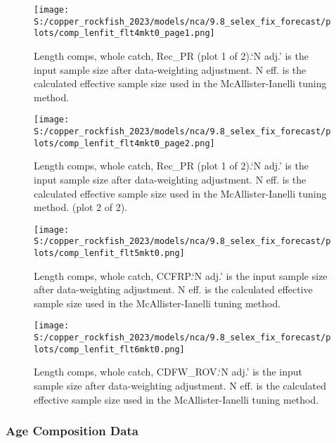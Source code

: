 \documentclass[11pt,
  english,
  letterpaper,
]{article}
\begin{document}
\begin{figure}
\centering
\texttt{[image: S:/copper\_rockfish\_2023/models/nca/9.8\_selex\_fix\_forecast/plots/comp\_lenfit\_flt4mkt0\_page1.png]}
\caption{Length comps, whole catch, Rec\_PR (plot 1 of 2).`N adj.' is the input sample size after data-weighting adjustment. N eff. is the calculated effective sample size used in the McAllister-Ianelli tuning method.\label{fig:comp_lenfit_flt4mkt0_page1}}
\end{figure}

\begin{figure}
\centering
\texttt{[image: S:/copper\_rockfish\_2023/models/nca/9.8\_selex\_fix\_forecast/plots/comp\_lenfit\_flt4mkt0\_page2.png]}
\caption{Length comps, whole catch, Rec\_PR (plot 1 of 2).`N adj.' is the input sample size after data-weighting adjustment. N eff. is the calculated effective sample size used in the McAllister-Ianelli tuning method. (plot 2 of 2).\label{fig:comp_lenfit_flt4mkt0_page2}}
\end{figure}

\begin{figure}
\centering
\texttt{[image: S:/copper\_rockfish\_2023/models/nca/9.8\_selex\_fix\_forecast/plots/comp\_lenfit\_flt5mkt0.png]}
\caption{Length comps, whole catch, CCFRP.`N adj.' is the input sample size after data-weighting adjustment. N eff. is the calculated effective sample size used in the McAllister-Ianelli tuning method.\label{fig:comp_lenfit_flt5mkt0}}
\end{figure}

\begin{figure}
\centering
\texttt{[image: S:/copper\_rockfish\_2023/models/nca/9.8\_selex\_fix\_forecast/plots/comp\_lenfit\_flt6mkt0.png]}
\caption{Length comps, whole catch, CDFW\_ROV.`N adj.' is the input sample size after data-weighting adjustment. N eff. is the calculated effective sample size used in the McAllister-Ianelli tuning method.\label{fig:comp_lenfit_flt6mkt0}}
\end{figure}

\newpage

\hypertarget{age-data}{%
\subsubsection{Age Composition Data}\label{age-data}}

\newpage
\end{document}
